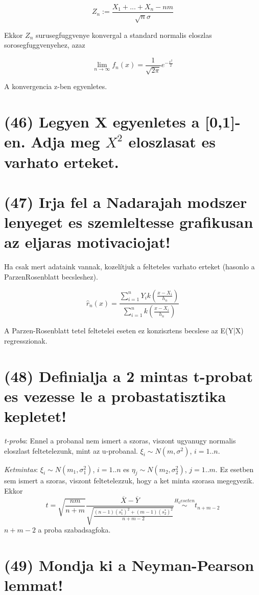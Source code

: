 \documentclass[12p]{article}
\begin{document}
$$Z_n := \frac{X_1 + ... + X_n - nm}{\sqrt{n}\sigma}$$

Ekkor $Z_n$ surusegfuggvenye konvergal a standard normalis
eloszlas sorosegfuggvenyehez, azaz

$$\lim_{n \rightarrow \infty} f_n(x) = \frac{1}{\sqrt{2\pi}} e^{- \frac{x^2}{2}}$$

A konvergencia z-ben egyenletes.

\section{(46) Legyen X egyenletes a [0,1]-en. Adja meg $X^2$ eloszlasat es varhato erteket.}

\section{(47) Irja fel a Nadarajah modszer lenyeget es szemleltesse grafikusan az eljaras motivaciojat! }

Ha csak mert adataink vannak, kozelítjuk a
felteteles varhato erteket (hasonlo a ParzenRosenblatt becsleshez).

$$\hat{r}_n(x) = \frac{\displaystyle{\sum^n_{i=1} Y_ik \left(\frac{x - X_i}{h_n}\right)}}{\displaystyle{\sum^n_{i=1} k \left(\frac{x - X_i}{h_n}\right)}}$$

A Parzen-Rosenblatt tetel feltetelei eseten ez
konzisztens becslese az E(Y|X) regresszionak.

\section{(48) Definialja a 2 mintas t-probat es vezesse le a probastatisztika kepletet!}

\textit{t-proba}:	Ennel a probanal nem ismert a szoras, viszont ugyanugy normalis eloszlast feltetelezunk, mint az u-probanal. $\xi_i \sim N(m, \sigma^2)$, $i=1..n$.

\textit{Ketmintas}: $\xi_i \sim N(m_1, \sigma_1^2)$, $i=1..n$ es $\eta_j \sim N(m_2, \sigma_2^2)$, $j=1..m$. Ez esetben sem ismert a szoras, viszont feltetelezzuk, hogy a ket minta szorasa megegyezik. Ekkor 
$$\displaystyle{t = \sqrt{\frac{nm}{n+m}}\frac{\overline{X} - \overline{Y}}{\sqrt{\frac{(n-1)(s^*_1)^2 + (m-1)(s^*_2)^2}{n+m-2}}} \stackrel{H_0 eseten}{\sim}
t_{n+m-2}}$$
$n+m-2$ a proba szabadsagfoka.

\section{(49) Mondja ki a Neyman-Pearson lemmat!}
\end{document}
